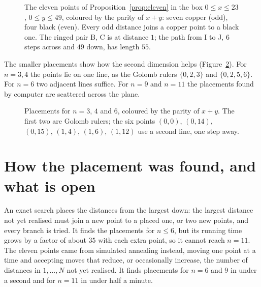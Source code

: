 \documentclass[11pt]{amsart}
\theoremstyle{remark}
\begin{document}
\begin{figure}[ht]
\centering
\begin{tikzpicture}
  
\end{tikzpicture}
\caption{The eleven points of Proposition~\ref{prop:eleven} in the box $0\le x\le23$, $0\le y\le49$, coloured by the parity of $x+y$: seven copper (odd), four black (even). Every odd distance joins a copper point to a black one. The ringed pair B, C is at distance $1$; the path from I to J, $6$ steps across and $49$ down, has length $55$.}
\label{fig:taxi}
\end{figure}

\begin{table}[ht]
\centering\small

\caption{Top: the distance between the points labelling each row and column. Bottom: the same $55$ numbers sorted, each with the pair that realises it; reading down the columns runs through $1,\dots,55$.}
\label{tab:taxi}
\end{table}

The smaller placements show how the second dimension helps (Figure~\ref{fig:small}). For $n=3,4$ the points lie on one line, as the Golomb rulers $\{0,2,3\}$ and $\{0,2,5,6\}$. For $n=6$ two adjacent lines suffice. For $n=9$ and $n=11$ the placements found by computer are scattered across the plane.

\begin{figure}[ht]
\centering
\begin{tikzpicture}
  
\end{tikzpicture}
\caption{Placements for $n=3$, $4$ and $6$, coloured by the parity of $x+y$. The first two are Golomb rulers; the six points $(0,0)$, $(0,14)$, $(0,15)$, $(1,4)$, $(1,6)$, $(1,12)$ use a second line, one step away.}
\label{fig:small}
\end{figure}

\section{How the placement was found, and what is open}

An exact search places the distances from the largest down: the largest distance not yet realised must join a new point to a placed one, or two new points, and every branch is tried. It finds the placements for $n\le6$, but its running time grows by a factor of about $35$ with each extra point, so it cannot reach $n=11$. The eleven points came from simulated annealing instead, moving one point at a time and accepting moves that reduce, or occasionally increase, the number of distances in $1,\dots,N$ not yet realised. It finds placements for $n=6$ and $9$ in under a second and for $n=11$ in under half a minute.
\end{document}
